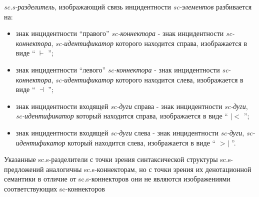 \textit{sc.s-разделитель}, изображающий связь инцидентности \textit{sc-элементов} разбивается на:
\begin{itemize}
	\item знак инцидентности “правого” \textit{sc-коннектора} - знак инцидентности \textit{sc-коннектора}, \textit{sc-идентификатор} которого находится справа, изображается в виде `` $ \vdash$ ''{};
	\item знак инцидентности “левого” \textit{sc-коннектора} - знак инцидентности \textit{sc-коннектора}, \textit{sc-идентификатор} которого находится слева, изображается в виде `` $ \dashv$ ''{};
	\item знак инцидентности входящей \textit{sc-дуги} справа - знак инцидентности \textit{sc-дуги}, \textit{sc-идентификатор} который находится справа, изображается в виде `` $ |<$ ''{};
	\item знак инцидентности входящей \textit{sc-дуги} слева - знак инцидентности \textit{sc-дуги}, \textit{sc-идентификатор} который находится слева, изображается в виде `` $ >| $ ''{}.
\end{itemize}


Указанные sc.s-разделители с точки зрения синтаксической структуры sc.s-предложений аналогичны sc.s-коннекторам, но с точки зрения их денотационной семантики в отличие от sc.s-коннекторов они не являются изображениями соответствующих sc-коннекторов
\newpage
{}

